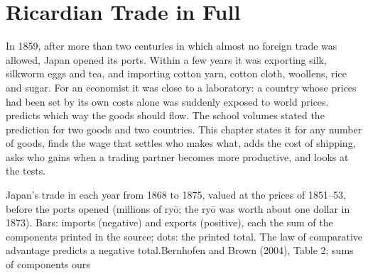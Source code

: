 \chapter{Ricardian Trade in Full}\label{ch:b3:ricardian-trade}

In 1859, after more than two centuries in which almost no foreign trade was
allowed, Japan opened its ports. Within a few years it was exporting silk,
silkworm eggs and tea, and importing cotton yarn, cotton cloth, woollens, rice
and sugar. %
For an economist it was close to a laboratory: a country whose prices had been
set by its own costs alone was suddenly exposed to world prices.  predicts which way the goods should flow. The school volumes stated
the prediction for two goods and two countries. This chapter states it for any
number of goods, finds the wage that settles who makes what, adds the cost of
shipping, asks who gains when a trading partner becomes more productive, and
looks at the tests.

\begin{openingchart}{Japan's trade in each year from 1868 to 1875, valued at
the prices of 1851--53, before the ports opened (millions of ryō; the ryō was
worth about one dollar in 1873). Bars: imports (negative) and exports (positive),
each the sum of the components printed in the source; dots: the printed total.
The law of comparative advantage predicts a negative total.}{Bernhofen and Brown
(2004), Table 2; sums of components ours}
\end{openingchart}

